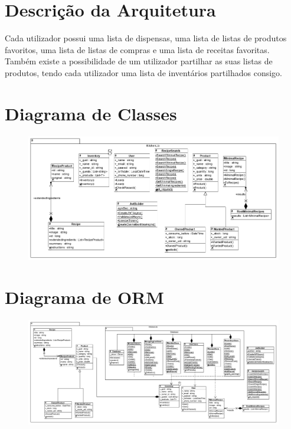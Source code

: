 \documentclass[a4paper]{report}
\begin{document}
    \section{Descrição da Arquitetura}
    Cada utilizador possui uma lista de dispensas, uma lista de listas de 
    produtos favoritos, uma lista de listas de compras e uma lista de receitas
    favoritas.
    Também existe a possibilidade de um utilizador partilhar as suas listas de
    produtos, tendo cada utilizador uma lista de inventários partilhados
    consigo.
    \section{Diagrama de Classes}
        \begin{figure}[H]
        \centering
                \includegraphics[width=\textwidth]{images/diagrama_de_classes.png}
        \end{figure}

    \section{Diagrama de ORM}
        \begin{figure}[H]
        \centering
            \includegraphics[width=\textwidth]{images/diagrama_de_ORN.png}
        \end{figure}
\end{document}
